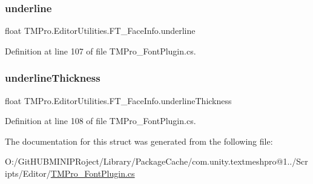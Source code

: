 \subsubsection{\texorpdfstring{underline}{underline}}
{\footnotesize\ttfamily float T\+M\+Pro.\+Editor\+Utilities.\+F\+T\+\_\+\+Face\+Info.\+underline}



Definition at line 107 of file T\+M\+Pro\+\_\+\+Font\+Plugin.\+cs.

\mbox{\label{struct_t_m_pro_1_1_editor_utilities_1_1_f_t___face_info_afcead314177c5c01ffc4d1f90d4fa507}} 
\subsubsection{\texorpdfstring{underlineThickness}{underlineThickness}}
{\footnotesize\ttfamily float T\+M\+Pro.\+Editor\+Utilities.\+F\+T\+\_\+\+Face\+Info.\+underline\+Thickness}



Definition at line 108 of file T\+M\+Pro\+\_\+\+Font\+Plugin.\+cs.



The documentation for this struct was generated from the following file\+:\begin{DoxyCompactItemize}
\item 
O\+:/\+Git\+H\+U\+B\+M\+I\+N\+I\+P\+Roject/\+Library/\+Package\+Cache/com.\+unity.\+textmeshpro@1../\+Scripts/\+Editor/\mbox{\hyperlink{_t_m_pro___font_plugin_8cs}{T\+M\+Pro\+\_\+\+Font\+Plugin.\+cs}}\end{DoxyCompactItemize}
